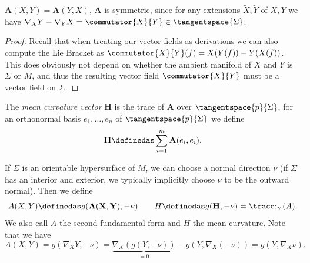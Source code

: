 \documentclass[titlepage,numbers=noenddot,headinclude,oneside,%
footinclude=true,cleardoublepage=empty,%
BCOR=5mm,paper=a4,fontsize=11pt,%
english,%
]{scrartcl}
\begin{document}
{\begin{fact}
    \( \mathbf{A}(X,Y)=\mathbf{A}(Y,X) \), \ie \( \mathbf{A} \) is symmetric, since for any extensions \( \tilde{X},\tilde{Y} \) of \( X,Y \) we have \( \Mconnection_X Y-\Mconnection_Y X=\commutator{X}{Y}\in \tangentspace{\Sigma} \).
\end{fact}
\begin{proof}
    Recall that when treating our vector fields as derivations we can also compute the Lie Bracket  as \( \commutator{X}{Y}(f)=X(Y(f))-Y(X(f)) \). This does obviously not depend on whether the ambient manifold of \( X \) and \( Y \) is \( \Sigma \) or \( M \), and thus the resulting vector field \( \commutator{X}{Y} \) must be a vector field on \( \Sigma \). 
\end{proof}
\begin{definition}
    The \emph{mean curvature vector} \( \mathbf{H} \) is the trace of \( \mathbf{A} \) over \( \tangentspace{p}{\Sigma} \), \ie for an orthonormal basis \( e_1,\dotsc,e_n \) of \( \tangentspace{p}{\Sigma} \) we define
    \begin{equation*}
        \mathbf{H}\definedas \sum_{i=1}^{m}\mathbf{A}(e_i,e_i).
    \end{equation*}
\end{definition}
If \( \Sigma \) is an orientable hypersurface of \( M \), we can choose a normal direction \( \nu \) (if \( \Sigma \) has an interior and exterior, we typically implicitly choose \( \nu \) to be the outward normal). Then we define
\begin{equation*}
    A(X,Y)\definedas g(\mathbf{A(X,Y)},-\nu)\qquad H\definedas g(\mathbf{H},-\nu)=\trace;_\gamma(A).
\end{equation*}
We also call \( A \) the second fundamental form and \( H \) the mean curvature. Note that we have
\begin{equation*}
    A(X,Y)=g(\nabla_X Y,-\nu)=\underbrace{\nabla_X (g(Y,-\nu))}_{=0}-g(Y,\nabla_X (-\nu))=g(Y,\nabla_X \nu).
\end{equation*}

}
\end{document}
